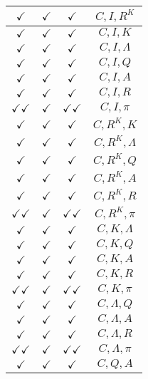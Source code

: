 \documentclass[a4paper,10pt]{article}
\begin{document}
\begin{longtable}{|c|c|c|c|}
\hline
$\checkmark$ & $\checkmark$ & $\checkmark$ & ${C},{I},{R^{K}}$ \\
\hline
$\checkmark$ & $\checkmark$ & $\checkmark$ & ${C},{I},{K}$ \\
\hline
$\checkmark$ & $\checkmark$ & $\checkmark$ & ${C},{I},{\Lambda}$ \\
\hline
$\checkmark$ & $\checkmark$ & $\checkmark$ & ${C},{I},{Q}$ \\
\hline
$\checkmark$ & $\checkmark$ & $\checkmark$ & ${C},{I},{A}$ \\
\hline
$\checkmark$ & $\checkmark$ & $\checkmark$ & ${C},{I},{R}$ \\
\hline
$\checkmark\checkmark$ & $\checkmark$ & $\checkmark\checkmark$ & ${C},{I},{\pi}$ \\
\hline
$\checkmark$ & $\checkmark$ & $\checkmark$ & ${C},{R^{K}},{K}$ \\
\hline
$\checkmark$ & $\checkmark$ & $\checkmark$ & ${C},{R^{K}},{\Lambda}$ \\
\hline
$\checkmark$ & $\checkmark$ & $\checkmark$ & ${C},{R^{K}},{Q}$ \\
\hline
$\checkmark$ & $\checkmark$ & $\checkmark$ & ${C},{R^{K}},{A}$ \\
\hline
$\checkmark$ & $\checkmark$ & $\checkmark$ & ${C},{R^{K}},{R}$ \\
\hline
$\checkmark\checkmark$ & $\checkmark$ & $\checkmark\checkmark$ & ${C},{R^{K}},{\pi}$ \\
\hline
$\checkmark$ & $\checkmark$ & $\checkmark$ & ${C},{K},{\Lambda}$ \\
\hline
$\checkmark$ & $\checkmark$ & $\checkmark$ & ${C},{K},{Q}$ \\
\hline
$\checkmark$ & $\checkmark$ & $\checkmark$ & ${C},{K},{A}$ \\
\hline
$\checkmark$ & $\checkmark$ & $\checkmark$ & ${C},{K},{R}$ \\
\hline
$\checkmark\checkmark$ & $\checkmark$ & $\checkmark\checkmark$ & ${C},{K},{\pi}$ \\
\hline
$\checkmark$ & $\checkmark$ & $\checkmark$ & ${C},{\Lambda},{Q}$ \\
\hline
$\checkmark$ & $\checkmark$ & $\checkmark$ & ${C},{\Lambda},{A}$ \\
\hline
$\checkmark$ & $\checkmark$ & $\checkmark$ & ${C},{\Lambda},{R}$ \\
\hline
$\checkmark\checkmark$ & $\checkmark$ & $\checkmark\checkmark$ & ${C},{\Lambda},{\pi}$ \\
\hline
$\checkmark$ & $\checkmark$ & $\checkmark$ & ${C},{Q},{A}$ \\

\end{longtable}
\end{document}
